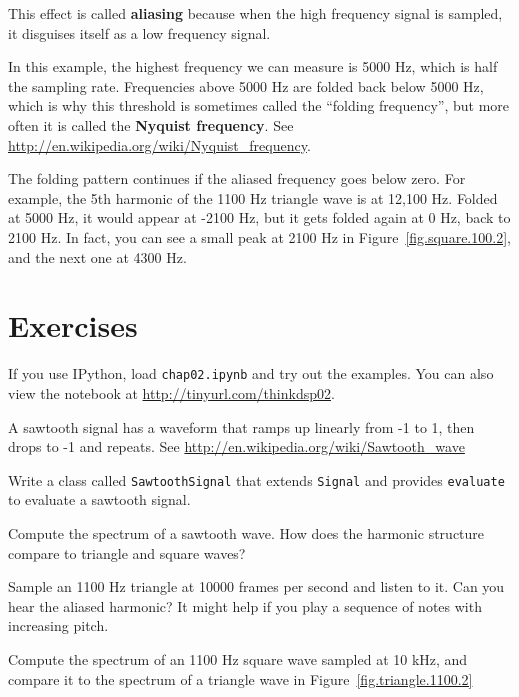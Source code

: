 \documentclass[12pt]{book}
\begin{document}
This effect is called {\bf aliasing} because when the high frequency
signal is sampled, it disguises itself as a low frequency signal.

In this example, the highest frequency we can measure is 5000 Hz,
which is half the sampling rate.  Frequencies above 5000 Hz are folded
back below 5000 Hz, which is why this threshold is sometimes called
the ``folding frequency'', but more often it is called the {\bf
  Nyquist frequency}.  See
\url{http://en.wikipedia.org/wiki/Nyquist_frequency}.

The folding pattern continues if the aliased frequency goes below
zero.  For example, the 5th harmonic of the 1100 Hz triangle wave is
at 12,100 Hz.  Folded at 5000 Hz, it would appear at -2100 Hz, but it
gets folded again at 0 Hz, back to 2100 Hz.  In fact, you can see a
small peak at 2100 Hz in Figure~\ref{fig.square.100.2}, and the next
one at 4300 Hz.


\section{Exercises}

\begin{exercise}
If you use IPython, load {\tt chap02.ipynb} and try out the examples.
You can also view the notebook at \url{http://tinyurl.com/thinkdsp02}.
\end{exercise}

\begin{exercise}
A sawtooth signal has a waveform that ramps up linearly from -1 to 1,
then drops to -1 and repeats. See
\url{http://en.wikipedia.org/wiki/Sawtooth_wave}

Write a class called
{\tt SawtoothSignal} that extends {\tt Signal} and provides
{\tt evaluate} to evaluate a sawtooth signal.

Compute the spectrum of a sawtooth wave.  How does the harmonic
structure compare to triangle and square waves?
\end{exercise}

\begin{exercise}
Sample an 1100 Hz triangle at 10000 frames per second and listen to it.
Can you hear the aliased harmonic?  It might help if you play a sequence of
notes with increasing pitch.
\end{exercise}

\begin{exercise}
Compute the spectrum of an 1100 Hz square wave sampled at 10 kHz, and
compare it to the spectrum of a triangle wave in
Figure~\ref{fig.triangle.1100.2}
\end{exercise}
\end{document}
